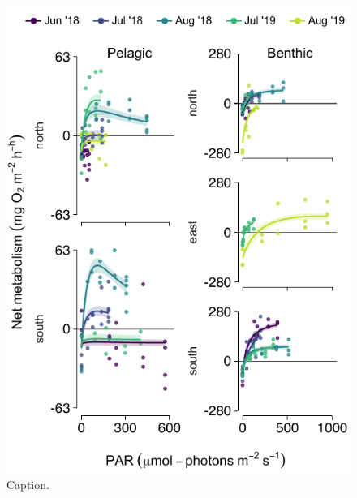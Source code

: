 \documentclass[12pt]{article}
\begin{document}

\clearpage



\clearpage









\begin{figure}
\centering
\linespread{1}
\includegraphics{../analysis/figures/fig_nep.pdf}
\caption{\label{fig:nep}
Caption.
}
\end{figure}
\end{document}
